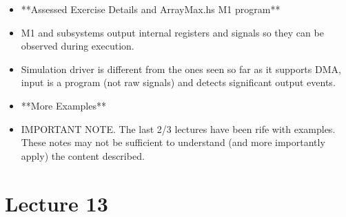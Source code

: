 \documentclass{article}
\begin{document}
\begin{itemize}
\item **Assessed Exercise Details and ArrayMax.hs M1 program**
\item M1 and subsystems output internal registers and signals so they can be observed during execution.
\item Simulation driver is different from the ones seen so far as it supports DMA, input is a program (not raw signals) and detects significant output events.
\item **More Examples**
\item IMPORTANT NOTE. The last 2/3 lectures have been rife with examples. These notes may not be sufficient to understand (and more importantly apply) the content described.

\end{itemize}

\section*{Lecture 13}
\end{document}
